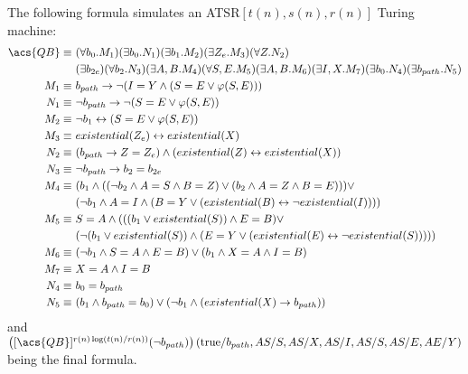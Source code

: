 The following formula simulates an \acs{ATSR}$[t(n), s(n), r(n)]$ Turing machine:
\[
    \begin{aligned}
        \acs{QB} \equiv&~(\forall b_{0}.M_{1})(\exists b_{0}.N_{1})(\exists b_{1}.M_{2})(\exists Z_{e}.M_{3})(\forall Z.N_{2})\\
        &~(\exists b_{2e})(\forall b_{2}.N_{3})(\exists A, B.M_{4})(\forall S, E.M_{5})(\exists A, B.M_{6})(\exists I, X.M_{7})(\exists b_{0}.N_{4})(\exists b_{path}.N_{5}) \\
        M_{1} \equiv&~b_{path} \to \neg(I = Y \land (S = E \lor \varphi(S, E))) \\
        N_{1} \equiv&~\neg b_{path} \to \neg(S = E \lor \varphi(S, E)) \\
        M_{2} \equiv&~\neg b_{1} \leftrightarrow (S = E \lor \varphi(S, E)) \\
        M_{3} \equiv&~existential(Z_{e}) \leftrightarrow existential(X)\\
        N_{2} \equiv&~(b_{path} \to Z = Z_{e}) \land (existential(Z) \leftrightarrow existential(X))\\
        N_{3} \equiv&~ \neg b_{path} \to b_{2} = b_{2e}\\
        M_{4} \equiv&~(b_{1} \land ((\neg b_{2} \land A = S  \land B = Z) \lor (b_{2} \land A = Z \land B = E))) \lor \\
        &~(\neg b_{1} \land  A = I \land (B = Y \lor (existential(B) \leftrightarrow \neg existential(I)))) \\
        M_{5} \equiv&~S = A \land ((( b_{1} \lor existential(S)) \land E = B) \lor \\
        &~(\neg( b_{1} \lor existential(S)) \land (E = Y \lor (existential(E)\leftrightarrow \neg existential(S))))) \\
        M_{6} \equiv&~(\neg b_{1}  \land S = A \land E = B) \lor (b_{1} \land X = A \land I = B)\\
        M_{7} \equiv&~X = A \land I = B \\
        N_{4} \equiv&~b_{0} = b_{path} \\
        N_{5} \equiv&~(b_{1} \land b_{path} = b_{0}) \lor (\neg b_{1} \land (existential(X) \to b_{path}))
    \end{aligned}
\]
and $\left([\acs{QB}]^{r(n)\log(t(n)/r(n))}(\neg b_{path})\right)(\text{true} / b_{path}, AS / S, AS / X, AS /I, AS /S, AS / E, AE / Y)$ being the final formula.

